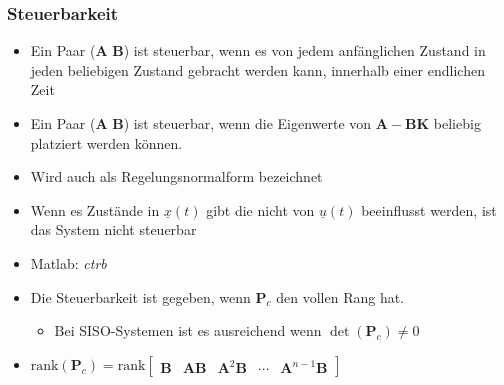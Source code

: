 \subsubsection{Steuerbarkeit}
\label{subsubsec:Steuerbarkeit}
\begin{itemize}
	\item Ein Paar ($\boldsymbol{A}$ $\boldsymbol{B}$) ist steuerbar, wenn es von jedem anfänglichen Zustand in jeden beliebigen Zustand gebracht werden kann, innerhalb einer endlichen Zeit
	\item Ein Paar ($\boldsymbol{A}$ $\boldsymbol{B}$) ist steuerbar, wenn die Eigenwerte von $\boldsymbol{A}-\boldsymbol{BK}$ beliebig platziert werden können. 
	\item Wird auch als Regelungsnormalform bezeichnet
	\item Wenn es Zustände in $\underline{x}(t)$ gibt die nicht von $\underline{u}(t)$ beeinflusst werden, ist das System nicht steuerbar
	\item Matlab: \textit{ctrb}
	\item Die Steuerbarkeit ist gegeben, wenn $\boldsymbol{P}_c$ den vollen Rang hat.
	\begin{itemize}
		\item Bei SISO-Systemen ist es ausreichend wenn $\det\left( \boldsymbol{P}_c\right) \neq 0$
	\end{itemize}
	\item $
	\text{rank}\left(\boldsymbol{P}_c\right)  = \text{rank}\begin{bmatrix}
	\boldsymbol{B} & \boldsymbol{AB} & \boldsymbol{A}^2\boldsymbol{B} &\cdots &\boldsymbol{A}^{n-1}\boldsymbol{B}
	\end{bmatrix}
	$
\end{itemize}


